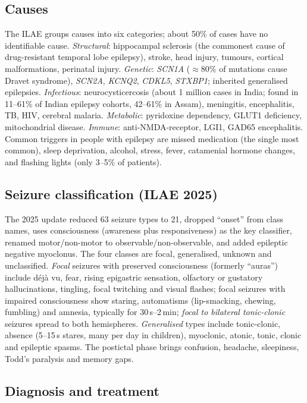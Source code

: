 \subsection{Causes}

The ILAE groups causes into six categories; about 50\% of cases have no identifiable cause. \emph{Structural}: hippocampal sclerosis (the commonest cause of drug-resistant temporal lobe epilepsy), stroke, head injury, tumours, cortical malformations, perinatal injury. \emph{Genetic}: \textit{SCN1A} ($\approx$80\% of mutations cause Dravet syndrome), \textit{SCN2A}, \textit{KCNQ2}, \textit{CDKL5}, \textit{STXBP1}; inherited generalised epilepsies. \emph{Infectious}: neurocysticercosis (about 1 million cases in India; found in 11--61\% of Indian epilepsy cohorts, 42--61\% in Assam), meningitis, encephalitis, TB, HIV, cerebral malaria. \emph{Metabolic}: pyridoxine dependency, GLUT1 deficiency, mitochondrial disease. \emph{Immune}: anti-NMDA-receptor, LGI1, GAD65 encephalitis. Common triggers in people with epilepsy are missed medication (the single most common), sleep deprivation, alcohol, stress, fever, catamenial hormone changes, and flashing lights (only 3--5\% of patients).

\subsection{Seizure classification (ILAE 2025)}

The 2025 update \cite{ilae2025} reduced 63 seizure types to 21, dropped ``onset'' from class names, uses consciousness (awareness plus responsiveness) as the key classifier, renamed motor/non-motor to observable/non-observable, and added epileptic negative myoclonus. The four classes are focal, generalised, unknown and unclassified. \emph{Focal} seizures with preserved consciousness (formerly ``auras'') include déjà vu, fear, rising epigastric sensation, olfactory or gustatory hallucinations, tingling, focal twitching and visual flashes; focal seizures with impaired consciousness show staring, automatisms (lip-smacking, chewing, fumbling) and amnesia, typically for 30\,s--2\,min; \emph{focal to bilateral tonic-clonic} seizures spread to both hemispheres. \emph{Generalised} types include tonic-clonic, absence (5--15\,s stares, many per day in children), myoclonic, atonic, tonic, clonic and epileptic spasms. The postictal phase brings confusion, headache, sleepiness, Todd's paralysis and memory gaps.

\subsection{Diagnosis and treatment}

